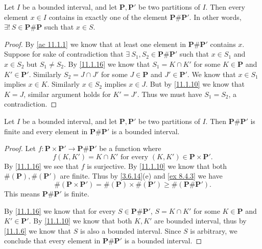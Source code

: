 \begin{additional corollary}\label{ac 11.1.2}
Let \(I\) be a bounded interval, and let \(\mathbf{P}, \mathbf{P}'\) be two partitions of \(I\).
Then every element \(x \in I\) contains in exactly one of the element \(\mathbf{P} \# \mathbf{P}'\).
In other words, \(\exists!\ S \in \mathbf{P} \# \mathbf{P}\) such that \(x \in S\).
\end{additional corollary}

\begin{proof}
  By \cref{ac 11.1.1} we know that at least one element in \(\mathbf{P} \# \mathbf{P}'\) contains \(x\).
  Suppose for sake of contradiction that \(\exists\ S_1, S_2 \in \mathbf{P} \# \mathbf{P}'\) such that \(x \in S_1\) and \(x \in S_2\) but \(S_1 \neq S_2\).
  By \cref{11.1.16} we know that \(S_1 = K \cap K'\) for some \(K \in \mathbf{P}\) and \(K' \in \mathbf{P}'\).
  Similarly \(S_2 = J \cap J'\) for some \(J \in \mathbf{P}\) and \(J' \in \mathbf{P}'\).
  We know that \(x \in S_1\) implies \(x \in K\).
  Similarly \(x \in S_2\) implies \(x \in J\).
  But by \cref{11.1.10} we know that \(K = J\), similar argument holds for \(K' = J'\).
  Thus we must have \(S_1 = S_2\), a contradiction.
\end{proof}

\begin{additional corollary}\label{ac 11.1.3}
Let \(I\) be a bounded interval, and let \(\mathbf{P}, \mathbf{P}'\) be two partitions of \(I\).
Then \(\mathbf{P} \# \mathbf{P}'\) is finite and every element in \(\mathbf{P} \# \mathbf{P}'\) is a bounded interval.
\end{additional corollary}

\begin{proof}
  Let \(f : \mathbf{P} \times \mathbf{P}' \to \mathbf{P} \# \mathbf{P}'\) be a function where
  \[
    f(K, K') = K \cap K' \text{ for every } (K, K') \in \mathbf{P} \times \mathbf{P}'.
  \]
  By \cref{11.1.16} we see that \(f\) is surjective.
  By \cref{11.1.10} we know that both \(\#(\mathbf{P}), \#(\mathbf{P}')\) are finite.
  Thus by \cref{3.6.14}(e) and \cref{ex 8.4.3} we have
  \[
    \#(\mathbf{P} \times \mathbf{P}') = \#(\mathbf{P}) \times \#(\mathbf{P}') \geq \#(\mathbf{P} \# \mathbf{P}').
  \]
  This means \(\mathbf{P} \# \mathbf{P}'\) is finite.

  By \cref{11.1.16} we know that for every \(S \in \mathbf{P} \# \mathbf{P}'\), \(S = K \cap K'\) for some \(K \in \mathbf{P}\) and \(K' \in \mathbf{P}'\).
  By \cref{11.1.10} we know that both \(K, K'\) are bounded interval, thus by \cref{11.1.6} we know that \(S\) is also a bounded interval.
  Since \(S\) is arbitrary, we conclude that every element in \(\mathbf{P} \# \mathbf{P}'\) is a bounded interval.
\end{proof}

